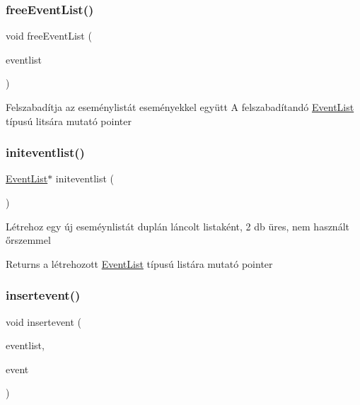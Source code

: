 \subsubsection{\texorpdfstring{free\+Event\+List()}{freeEventList()}}
{\footnotesize\ttfamily void free\+Event\+List (\begin{DoxyParamCaption}\item[{\hyperlink{struct_event_list}{Event\+List} $\ast$}]{eventlist }\end{DoxyParamCaption})}

Felszabadítja az eseménylistát eseményekkel együtt A felszabadítandó \hyperlink{struct_event_list}{Event\+List} típusú litsára mutató pointer \mbox{\label{group__list_ga48f44148563512bd32274821f478bd1b}} 
\subsubsection{\texorpdfstring{initeventlist()}{initeventlist()}}
{\footnotesize\ttfamily \hyperlink{struct_event_list}{Event\+List}$\ast$ initeventlist (\begin{DoxyParamCaption}{ }\end{DoxyParamCaption})}

Létrehoz egy új eseméynlistát duplán láncolt listaként, 2 db üres, nem használt őrszemmel \begin{DoxyReturn}{Returns}
a létrehozott \hyperlink{struct_event_list}{Event\+List} típusú listára mutató pointer 
\end{DoxyReturn}
\mbox{\label{group__list_ga068e74dedbc5bf00dd54042ab3fac981}} 
\subsubsection{\texorpdfstring{insertevent()}{insertevent()}}
{\footnotesize\ttfamily void insertevent (\begin{DoxyParamCaption}\item[{\hyperlink{struct_event_list}{Event\+List} const $\ast$}]{eventlist,  }\item[{\hyperlink{struct_event}{Event} $\ast$}]{event }\end{DoxyParamCaption})}

